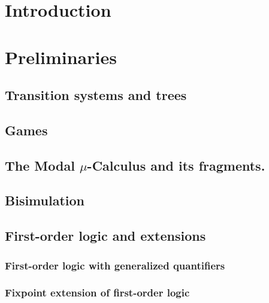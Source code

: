 \documentclass[prodmode,acmtecs]{acmsmall} %
\begin{document}

\clearpage

\tableofcontents

\clearpage



\section{Introduction}\label{sec:intro}


\clearpage


\section{Preliminaries}\label{sec:prel}

\subsection{Transition systems and trees} \label{ssec:prelim_trees}

\subsection{Games}



\subsection{The Modal $\mu$-Calculus and its fragments.}\label{subsec:mu}



\subsection{Bisimulation}


\subsection{First-order logic and extensions}

\subsubsection{First-order logic with generalized quantifiers}

\subsubsection{Fixpoint extension of first-order logic}

\end{document}
